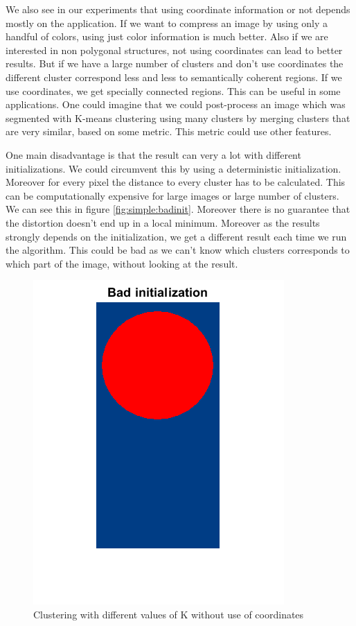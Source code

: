 We also see in our experiments that using coordinate information or not depends mostly on the application. If we want to compress an image by using only a handful of colors, using just color information is much better. Also if we are interested in non polygonal structures, not using coordinates can lead to better results. But if we have a large number of clusters and don't use coordinates the different cluster correspond less and less to semantically coherent regions. If we use coordinates, we get specially connected regions. This can be useful in some applications. One could imagine that we could post-process an image which was segmented with K-means clustering using many clusters by merging clusters that are very similar, based on some metric. This metric could use other features.

One main disadvantage is that the result can very a lot with different initializations. We could circumvent this by using a deterministic initialization. Moreover for every pixel the distance to every cluster has to be calculated. This can be computationally expensive for large images or large number of clusters. We can see this in figure \ref{fig:simple:badinit}. Moreover there is no guarantee that the distortion doesn't end up in a local minimum. Moreover as the results strongly depends on the initialization, we get a different result each time we run the algorithm. This could be bad as we can't know which clusters corresponds to which part of the image, without looking at the result. 

\begin{figure}[h!]
\centering
\includegraphics[width =0.5\linewidth]{figures/task2/bad_initialization.png}
\caption{Clustering with different values of K without use of coordinates}
\label{fig:mm:coords:manyK}
\end{figure}